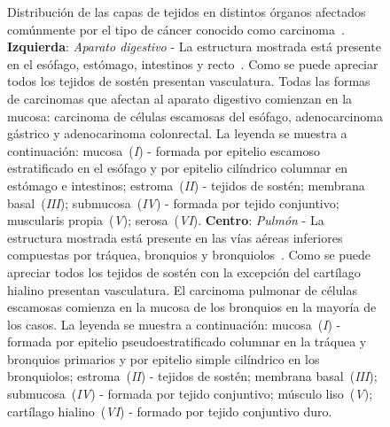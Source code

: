 \begin{figure}[!ht]
\begin{center}
\end{center}\vspace*{-0.6cm}
\caption[Distribuci\'on de las capas de tejidos en distintos \'organos]{Distribuci\'on de las capas de tejidos en distintos \'organos afectados com\'unmente por el tipo de c\'ancer conocido como carcinoma~\cite{robins}.\newline
\textbf{Izquierda}: \textit{Aparato digestivo} - La estructura mostrada est\'a presente en el es\'ofago, est\'omago, intestinos y recto~\cite{stomach}. Como se puede apreciar todos los tejidos de sost\'en presentan vasculatura. Todas las formas de carcinomas que afectan al aparato digestivo comienzan en la mucosa: carcinoma de c\'elulas escamosas del es\'ofago, adenocarcinoma g\'astrico y adenocarinoma colonrectal. La leyenda se muestra a continuaci\'on: mucosa~(\emph{I}) - formada por epitelio escamoso estratificado en el es\'ofago y por epitelio cil\'indrico columnar en est\'omago e intestinos; estroma~(\emph{II}) - tejidos de sost\'en; membrana basal~(\emph{III}); submucosa~(\emph{IV}) - formada por tejido conjuntivo; muscularis propia~(\emph{V}); serosa~(\emph{VI}).\newline
\textbf{Centro}: \textit{Pulm\'on} - La estructura mostrada est\'a presente en las v\'ias a\'ereas inferiores compuestas por tr\'aquea, bronquios y bronquiolos~\cite{lung}. Como se puede apreciar todos los tejidos de sost\'en con la excepci\'on del cart\'ilago hialino presentan vasculatura. El carcinoma pulmonar de c\'elulas escamosas comienza en la mucosa de los bronquios en la mayor\'ia de los casos. La leyenda se muestra a continuaci\'on: mucosa~(\emph{I}) - formada por epitelio pseudoestratificado columnar en la tr\'aquea y bronquios primarios y por epitelio simple cil\'indrico en los bronquiolos; estroma~(\emph{II}) - tejidos de sost\'en; membrana basal~(\emph{III}); submucosa~(\emph{IV}) - formada por tejido conjuntivo; m\'usculo liso~(\emph{V}); cart\'ilago hialino~(\emph{VI}) - formado por tejido conjuntivo duro.\newline
}
\end{figure}
